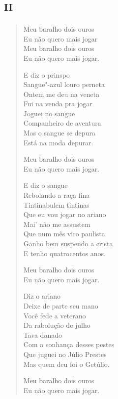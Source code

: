 \chapter[«Meu baralho dois ouros»]{\textsc{ii}}

\begin{verse}
\qquad\qquad\quad Meu baralho dois ouros\\
\qquad\qquad\quad Eu não quero mais jogar\\
\qquad\qquad\quad Meu baralho dois ouros\\
\qquad\qquad\quad Eu não quero mais jogar.

E diz o prinspo\\
Sangue"-azul louro perneta\\
Ontem me deu na veneta\\
Fui na venda pra jogar\\
Joguei no sangue\\
Companheiro de aventura\\
Mas o sangue se depura\\
Está na moda depurar.

\qquad\qquad\quad Meu baralho dois ouros\\
\qquad\qquad\quad Eu não quero mais jogar.

E diz o sangue\\
Rebolando a raça fina\\
Tintinabulem tintinas\\
Que eu vou jogar no ariano\\
Mai' não me assustem\\
Que num mês viro paulista\\
Ganho bem suspendo a crista\\
E tenho quatrocentos anos.

\qquad\qquad\quad Meu baralho dois ouros\\
\qquad\qquad\quad Eu não quero mais jogar.

Diz o ariano\\
Deixe de parte seu mano\\
Você fede a veterano\\
Da rabolução de julho\\
Tava danado\\
Com a sonhança desses pestes\\
Que juguei no Júlio Prestes\\
Mas quem deu foi o Getúlio.

\qquad\qquad\quad Meu baralho dois ouros\\
\qquad\qquad\quad Eu não quero mais jogar.


\end{verse}
